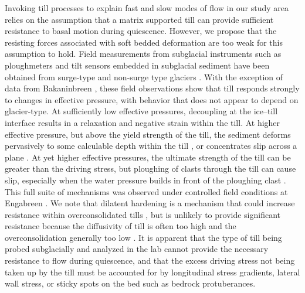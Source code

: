 \documentclass[review]{igs}
\begin{document}
Invoking till processes to explain fast and slow modes of flow in our study area relies on the assumption that a matrix supported till can provide sufficient resistance to basal motion during quiescence. However, we propose that the resisting forces associated with soft bedded deformation are too weak for this assumption to hold. Field measurements from subglacial instruments such as ploughmeters and tilt sensors embedded in subglacial sediment have been obtained from surge-type \citep{Blake1994,Fischer1994,Kavanaugh2006,Porter1997,Porter2001,Truffer2000,Truffer2006} and non-surge type glaciers \citep{Fischer2001,Iverson1994,Hooke1997,Mair2003,Iverson2007}. With the exception of data from Bakaninbreen \citep{Porter1997,Porter2001}, these field observations show that till responds strongly to changes in effective pressure, with behavior that does not appear to depend on glacier-type. At sufficiently low effective pressures, decoupling at the ice--till interface results in a relaxation and negative strain within the till. At higher effective pressure, but above the yield strength of the till, the sediment deforms pervasively to some calculable depth within the till \citep[e.g.][]{Damsgaard2013,Iverson2001,Tulaczyk2000}, or concentrates slip across a plane \citep[e.g.][]{Iverson1998,Truffer2000}. At yet higher effective pressures, the ultimate strength of the till can be greater than the driving stress, but ploughing of clasts through the till can cause slip, especially when the water pressure builds in front of the ploughing clast \citep{Iverson1999,Iverson2007,Thomason2008,Tulaczyk2001}. This full suite of mechanisms was observed under controlled field conditions at Engabreen \citep{Iverson2007}. We note that dilatent hardening is a mechanism that could increase resistance within overconsolidated tills \citep[e.g.][]{Moore2002}, but is unlikely to provide significant resistance because the diffusivity of till is often too high \citep{Iverson2010} and the overconsolidation generally too low \citep{Tulaczyk2000}. It is apparent that the type of till being probed subglacially and analyzed in the lab cannot provide the necessary resistance to flow during quiescence, and that the excess driving stress not being taken up by the till must be accounted for by longitudinal stress gradients, lateral wall stress, or sticky spots on the bed such as bedrock protuberances. %
\end{document}
